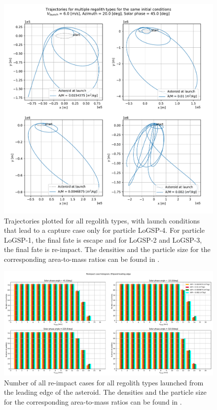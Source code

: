 \begin{figure}[!h]
\centering
\captionsetup{justification=centering}
\includegraphics[width=\textwidth, height=\textheight, keepaspectratio=true]{longest_edge_perturbations/multiple_regolith_types/2d_traj_6ms_20Azim_45SolarPhase_individualTrajPlots.pdf}
\caption{Trajectories plotted for all regolith types, with launch conditions that lead to a capture case only for particle LoGSP-4. For particle LoGSP-1, the final fate is escape and for LoGSP-2 and LoGSP-3, the final fate is re-impact. The densities and the particle size for the corresponding area-to-mass ratios can be found in .}
\label{fig:allRegolith_traj_6ms_20Azim_45solarPhase}
\end{figure}
\FloatBarrier
\begin{figure}[htb]
\centering
\captionsetup{justification=centering}
\includegraphics[angle=90, width=\textwidth, height=\textheight, keepaspectratio=true]{leading_edge_perturbations/allReimpactCases.pdf}
\caption{Number of all re-impact cases for all regolith types launched from the leading edge of the asteroid. The densities and the particle size for the corresponding area-to-mass ratios can be found in .}
\label{fig:leadingEdge_allParticles_reimpact_hist}
\end{figure}
